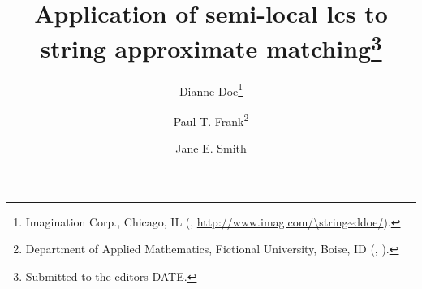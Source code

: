 

\usepackage{lipsum}
\usepackage{amsfonts}
\usepackage{graphicx}
\usepackage{epstopdf}
\usepackage{algorithmic}
\ifpdf
\else
\fi

\newcommand{\creflastconjunction}{, and~}



\title{Application of semi-local lcs to string approximate matching\thanks{Submitted to the editors DATE.
}}

\author{Dianne Doe\thanks{Imagination Corp., Chicago, IL 
  (, \url{http://www.imag.com/\string~ddoe/}).}
\and Paul T. Frank\thanks{Department of Applied Mathematics, Fictional University, Boise, ID 
  (, ).}
\and Jane E. Smith\footnotemark[3]}

\usepackage{amsopn}
\DeclareMathOperator{\diag}{diag}


